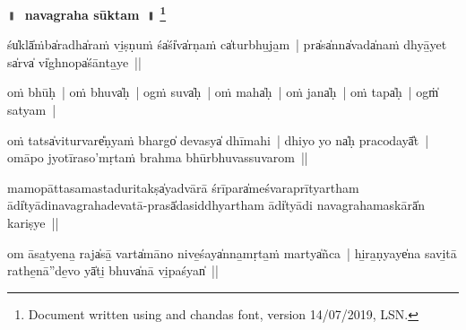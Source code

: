 \documentclass[parskip, DIV=14]{scrartcl}
\renewcommand{\thefootnote}{\fnsymbol{footnote}} %
\begin{document}

\vspace{-1.5cm}

\begin{center}
\textbf{{\Huge॥\,~navagraha sūktam~॥  \LARGE\let\thefootnote\relax\footnote{\color{lightgray} Document written using \XeLaTeX{} and chandas font,  version 14/07/2019, LSN.}}}
\end{center}
\Large

{%


śu̍klā̍ṁba̍radha̍raṁ vi̱ṣṇuṁ śa̍śi̍va̍rṇaṁ ca̍turbhu̱ja̱m~|
pra̍sa̍nna̍vada̍naṁ dhyā̱yet sa̍rva̍ vi̍ghnopa̍śānta̱ye॒~||

oṁ bhūḥ~| oṁ bhuva̍ḥ~| ogṁ॒ suva̍ḥ~| oṁ maha̍ḥ~| oṁ jana̍ḥ~| oṁ tapa̍ḥ~| ogṁ̍ sa॒tyam~|

oṁ tatsa̍vi॒turvare̎ṇya॒ṁ bhargo̍ de॒vasya̍ dhīmahi~|
dhiyo॒ yo na̍ḥ praco॒dayā̎t~| omāpo॒ jyotī॒raso॒'mṛta॒ṁ brahma॒ bhūrbhuva॒ssuva॒rom~||

\vspace{0.5cm}


mamopāttasamastaduritakṣa̍yadvā॒rā śrīpara̍meśvaraprītyartham ādi̍tyādinavagrahadevatā-prasā̍dasiddhyartham ādi̍tyādi navagrahamaskārā̍n kari॒ṣye~||




\vspace{0.5cm}


om āsa̱tyena̱ raja̍sā̱ varta̍māno nive̱śaya̍nna̱mṛta̱ṁ martya̍ñca~| 
hi̱ra̱ṇyaye̍na savi̱tā rathe̱nā''de̱vo yā̍ti̱ bhuva̍nā vi̱paśyan̍~||
 
}
\end{document}

